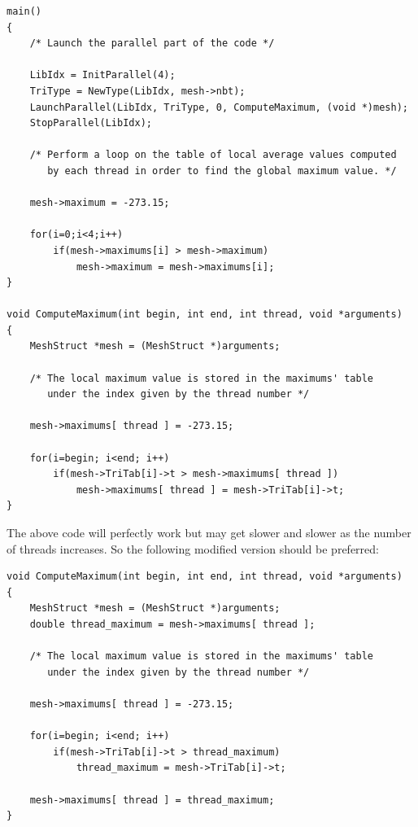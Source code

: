 \documentclass[a4paper,12pt]{article}
\begin{document}
\begin{tt}
\begin{verbatim}
main()
{
    /* Launch the parallel part of the code */

    LibIdx = InitParallel(4);
    TriType = NewType(LibIdx, mesh->nbt);
    LaunchParallel(LibIdx, TriType, 0, ComputeMaximum, (void *)mesh);
    StopParallel(LibIdx);

    /* Perform a loop on the table of local average values computed
       by each thread in order to find the global maximum value. */

    mesh->maximum = -273.15;

    for(i=0;i<4;i++)
        if(mesh->maximums[i] > mesh->maximum)
            mesh->maximum = mesh->maximums[i];
}

void ComputeMaximum(int begin, int end, int thread, void *arguments)
{
    MeshStruct *mesh = (MeshStruct *)arguments;

    /* The local maximum value is stored in the maximums' table
       under the index given by the thread number */

    mesh->maximums[ thread ] = -273.15;

    for(i=begin; i<end; i++)
        if(mesh->TriTab[i]->t > mesh->maximums[ thread ])
            mesh->maximums[ thread ] = mesh->TriTab[i]->t;
}
\end{verbatim}
\end{tt}
\normalfont

The above code will perfectly work but may get slower and slower as the number of threads increases. So the following modified version should be preferred:

\begin{tt}
\begin{verbatim}
void ComputeMaximum(int begin, int end, int thread, void *arguments)
{
    MeshStruct *mesh = (MeshStruct *)arguments;
    double thread_maximum = mesh->maximums[ thread ];

    /* The local maximum value is stored in the maximums' table
       under the index given by the thread number */

    mesh->maximums[ thread ] = -273.15;

    for(i=begin; i<end; i++)
        if(mesh->TriTab[i]->t > thread_maximum)
            thread_maximum = mesh->TriTab[i]->t;

    mesh->maximums[ thread ] = thread_maximum;
}
\end{verbatim}
\end{tt}
\normalfont
\end{document}
